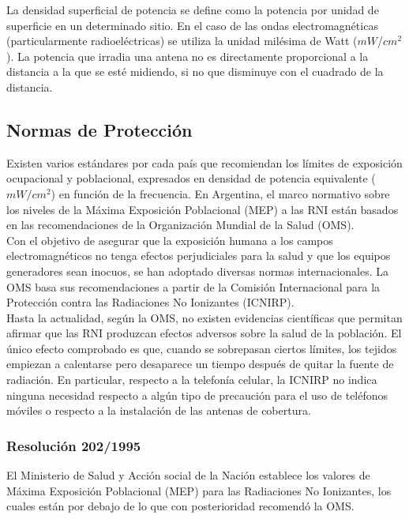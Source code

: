 La densidad superficial de potencia se define como la potencia por unidad de superficie en un determinado sitio. En el caso de las ondas electromagnéticas (particularmente radioeléctricas) se utiliza la unidad milésima de Watt ($mW$/$cm^2$). La potencia que irradia una antena no es directamente proporcional a la distancia a la que se esté midiendo, si no que disminuye con el cuadrado de la distancia.


\subsection{Normas de Protección}
Existen varios estándares por cada país que recomiendan los límites de exposición ocupacional y poblacional, expresados en densidad de potencia equivalente ($mW/cm^2$) en función de la frecuencia. En Argentina, el marco normativo sobre los niveles de la Máxima Exposición Poblacional (MEP) a las RNI están basados en las recomendaciones de la Organización Mundial de la Salud (OMS).\\

Con el objetivo de asegurar que la exposición humana a los campos electromagnéticos no tenga efectos perjudiciales para la salud y que los equipos generadores sean inocuos, se han adoptado diversas normas internacionales. La OMS basa sus recomendaciones a partir de la Comisión Internacional para la Protección contra las Radiaciones No Ionizantes (ICNIRP). \\

Hasta la actualidad, según la OMS, no existen evidencias científicas que permitan afirmar que las RNI produzcan efectos adversos sobre la salud de la población. El único efecto comprobado es que, cuando se sobrepasan ciertos límites, los tejidos empiezan a calentarse pero desaparece un tiempo después de quitar la fuente de radiación. En particular, respecto a la telefonía celular, la ICNIRP no indica ninguna necesidad respecto a algún tipo de precaución para el uso de teléfonos móviles o respecto a la instalación de las antenas de cobertura.\\

\subsubsection*{Resolución 202/1995}
El Ministerio de Salud y Acción social de la Nación establece los valores de Máxima Exposición Poblacional (MEP) para las Radiaciones No Ionizantes, los cuales están por debajo de lo que con posterioridad recomendó la OMS.

